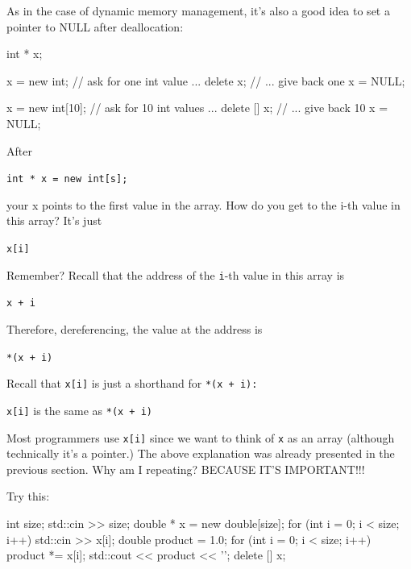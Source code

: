 As in the case of dynamic memory management, it's also a good idea to set a pointer to NULL after deallocation:

\begin{consolethree}[escapeinside=||]
int * x;

x = new int;     // ask for one int value ...
delete x;        // ... give back one
x = NULL;

x = new int[10]; // ask for 10 int values ...
delete [] x;     // ... give back 10
x = NULL;
\end{consolethree}





After

\verb!int * x = new int[s];!

your x points to the first value in the array. How do you get to the
i-th value in this array? It's just

\texttt{x[i]}

Remember? Recall that the address of the \texttt{i}-th value in this array
is

\texttt{x + i}

Therefore, dereferencing, the value at the address is

\texttt{*(x + i)}

Recall that \texttt{x[i]} is just a shorthand for \texttt{*(x + i):}

\texttt{x[i]}         is the same as              \texttt{*(x + i)}

Most programmers use \texttt{x[i]} since we want to think of \texttt{x} as an array (although technically it's a pointer.) The above explanation was already presented in the previous section. Why am I repeating? BECAUSE IT'S IMPORTANT!!!

Try this:

\begin{consolethree}[escapeinside=||]
int size;
std::cin >> size;
double * x = new double[size];
for (int i = 0; i < size; i++)
{
    std::cin >> x[i];
}
double product = 1.0;
for (int i = 0; i < size; i++)
{
    product *= x[i];
    std::cout << product << '\n';
}
delete [] x;
\end{consolethree}





